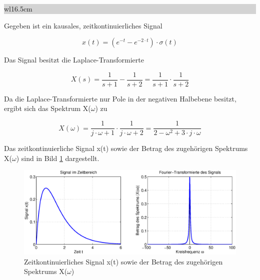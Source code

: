 \noindent
\colorbox{lightgray}{%
%
\renewcommand\arraystretch{0.6}%
\begin{tabular}{ wl{16.5cm} }
{\selectfont{Beispiel: Zusammenhang zwischen Spektren zeitkontinuierlicher Signale und Signalfolgen}}
\end{tabular}%
}\medskip

\noindent Gegeben ist ein kausales, zeitkontinuierliches Signal

\begin{equation}\label{eq:sevenninetyteight}
x\left(t\right)=\left(e^{-t} -e^{-2\cdot t} \right)\cdot \sigma \left(t\right)
\end{equation}

\noindent Das Signal besitzt die Laplace-Transformierte 

\begin{equation}\label{eq:sevenninetytnine}
X\left(s\right)=\frac{1}{s+1} -\frac{1}{s+2} =\frac{1}{s+1} \cdot \frac{1}{s+2}
\end{equation}

\noindent Da die Laplace-Transformierte nur Pole in der negativen Halbebene besitzt, ergibt sich das Spektrum X($\omega$) zu

\begin{equation}\label{eq:sevenonehundred}
X\left(\omega \right)=\frac{1}{j\cdot \omega +1} \cdot \frac{1}{j\cdot \omega +2} =\frac{1}{2-\omega ^{2} +3\cdot j\cdot \omega}
\end{equation}

\noindent Das zeitkontinuierliche Signal x(t) sowie der Betrag des zugeh\"{o}rigen Spektrums {\textbar}X($\omega$){\textbar} sind in Bild \ref{fig:VergleichSpektrumSignaleFolgen1} dargestellt.

\begin{figure}[H]
  \centerline{\includegraphics[width=1\textwidth]{Kapitel7/Bilder/image15.eps}}
  \caption{Zeitkontinuierliches Signal x(t) sowie der Betrag des zugeh\"{o}rigen Spektrums {\textbar}X($\omega$){\textbar}}
  \label{fig:VergleichSpektrumSignaleFolgen1}
\end{figure}

